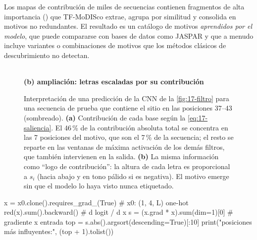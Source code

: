 Los mapas de contribución de miles de secuencias contienen fragmentos de alta importancia () que TF-MoDISco \parencite{c17-shrikumar2018} extrae, agrupa por similitud y consolida en motivos no redundantes. El resultado es un catálogo de motivos \emph{aprendidos por el modelo}, que puede compararse con bases de datos como JASPAR y que a menudo incluye variantes o combinaciones de motivos que los métodos clásicos de descubrimiento no detectan.

\begin{figure}[!tbp]
\centering
%
\\[4pt]
{\sffamily\bfseries\scriptsize (b) ampliación: letras escaladas por su contribución}\\[2pt]

\caption[Mapa de saliencia de una CNN]{Interpretación de una predicción de la CNN de la \cref{fig:17-filtro} para una secuencia de prueba que contiene el sitio  en las posiciones 37--43 (sombreado). \textbf{(a)} Contribución de cada base según la \cref{eq:17-saliencia}. El 46\,\% de la contribución absoluta total se concentra en las 7 posiciones del motivo, que son el 7\,\% de la secuencia; el resto se reparte en las ventanas de máxima activación de los demás filtros, que también intervienen en la salida. \textbf{(b)} La misma información como ``logo de contribución'': la altura de cada letra es proporcional a $s_i$ (hacia abajo y en tono pálido si es negativa). El motivo emerge sin que el modelo lo haya visto nunca etiquetado.}
\label{fig:17-saliencia}
\end{figure}

\begin{codigo}[saliencia.py]
x = x0.clone().requires_grad_(True)     # x0: (1, 4, L) one-hot
red(x).sum().backward()                  # d logit / d x
s = (x.grad * x).sum(dim=1)[0]           # gradiente x entrada
top = s.abs().argsort(descending=True)[:10]
print("posiciones más influyentes:", (top + 1).tolist())
\end{codigo}


